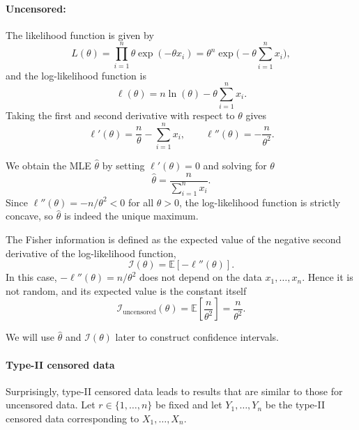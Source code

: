 \paragraph{Uncensored:}

The likelihood function is given by
\[
L(\theta) = \prod_{i=1}^n \theta \exp(- \theta x_i)
= \theta^n \exp\!\Big(- \theta \sum_{i = 1}^n x_i\Big),
\]
and the log-likelihood function is
\begin{equation} \label{log likelihood function uncensored}
	\ell(\theta) = n \ln (\theta) - \theta \sum_{i = 1}^n x_i .
\end{equation}
Taking the first and second derivative with respect to $\theta$ gives
\[
\ell'(\theta) = \frac{n}{\theta} - \sum_{i = 1}^n x_i,
\qquad
\ell''(\theta) = - \frac{n}{\theta^2}.
\]

We obtain the MLE $\hat\theta$ by setting $\ell'(\theta) = 0$ and solving for $\theta$
\begin{equation} \label{MLE for uncensored}
	\hat\theta = \frac{n}{\sum_{i = 1}^n x_i}. 
\end{equation}
Since $\ell''(\theta) = -n/\theta^2 < 0$ for all $\theta > 0$, the log-likelihood function is strictly concave, so $\hat\theta$ is indeed the unique maximum.

The Fisher information is defined as the expected value of the negative second derivative of the log-likelihood function,
\[
\mathcal{I}(\theta) = \mathbb{E}\left[ - \ell''(\theta) \right].
\]
In this case, $-\ell''(\theta) = n/\theta^2$ does not depend on the data $x_1, \ldots, x_n$. 
Hence it is not random, and its expected value is the constant itself
\begin{equation} \label{fisher info exp uncensored}
	\mathcal{I}_{\text{uncensored}}(\theta)
	=
	\mathbb{E} \left[ \frac{n}{\theta^2} \right]
	=
	\frac{n}{\theta^2}.
\end{equation}

We will use $\hat\theta$ and $\mathcal{I}(\theta)$ later to construct confidence intervals.

\paragraph{Type-II censored data}
Surprisingly, type-II censored data leads to results that are similar to those for uncensored data.
Let $r \in \{1, \ldots, n\}$ be fixed and let $Y_1, \ldots, Y_n$ be the type-II censored data corresponding to $X_1, \ldots, X_n$.


